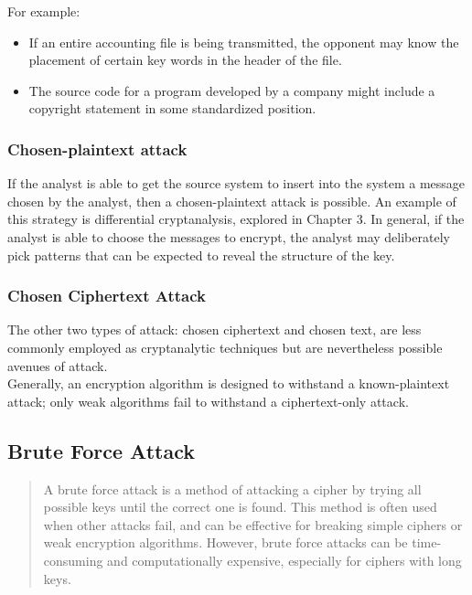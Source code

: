 \documentclass[11pt]{article}
\begin{document}
For example:
\begin{itemize}
    \item If an entire accounting file is being transmitted, the opponent may know the placement of certain key words in the header of the file.
    \item The source code for a program developed by a company might include a copyright statement in some standardized position.
\end{itemize}


\subsubsection{Chosen-plaintext attack}
If the analyst is able to get the source system to insert into the system a message chosen by the analyst, then a chosen-plaintext attack is possible. An example of this strategy is differential cryptanalysis, explored in Chapter 3. In general, if the analyst is able to choose the messages to encrypt, the analyst may deliberately pick patterns that can be expected to reveal the structure of the key.


\subsubsection{Chosen Ciphertext Attack}
The other two types of attack: chosen ciphertext and chosen text, are less commonly employed as cryptanalytic techniques but are nevertheless possible avenues of attack. \\

Generally, an encryption algorithm is designed to withstand a known-plaintext attack; only weak algorithms fail to withstand a ciphertext-only attack.

\subsection{Brute Force Attack}
\begin{quotation}

    A brute force attack is a method of attacking a cipher by trying all possible keys until the correct one is found. This method is often used when other attacks fail, and can be effective for breaking simple ciphers or weak encryption algorithms. However, brute force attacks can be time-consuming and computationally expensive, especially for ciphers with long keys.

\end{quotation}
\end{document}
